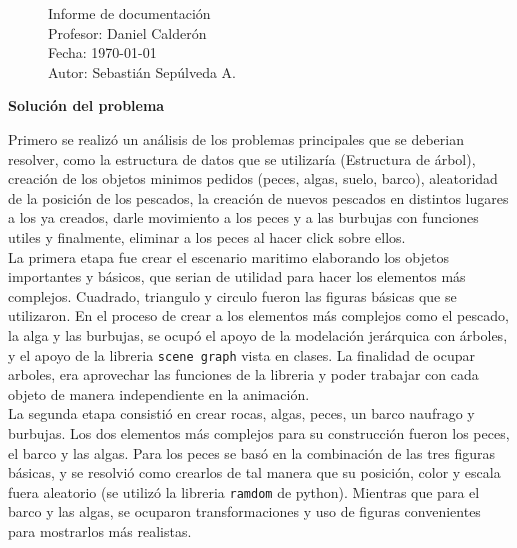 \documentclass[letterpaper,11pt]{article}
\begin{document}
\pagestyle{style2}
\begin{figure}
\centering
\begin{minipage}[c]{0.8\textwidth}
\centering
\vspace{0.3cm}
{\Large Informe de documentación}
\vspace{0.3cm}\\
Profesor: Daniel Calderón\\
Fecha: \today\\
Autor: Sebastián Sepúlveda A.
\end{minipage}
\end{figure}

\textbf{{\Large Solución del problema}}

Primero se realizó un análisis de los problemas principales que se deberian resolver, como la estructura de datos que se utilizaría (Estructura de árbol), creación de los objetos minimos pedidos (peces, algas, suelo, barco), aleatoridad de la posición de los pescados, la creación de nuevos pescados en distintos lugares a los ya creados, darle movimiento a los peces y a las burbujas con funciones utiles y finalmente, eliminar a los peces al hacer click sobre ellos.
\\

La primera etapa fue crear el escenario maritimo elaborando los objetos importantes y básicos, que serian de utilidad para hacer los elementos más complejos. Cuadrado, triangulo y circulo  fueron las figuras básicas que se utilizaron. En el proceso de crear a los elementos más complejos como el pescado, la alga y las burbujas, se ocupó el apoyo de la modelación jerárquica con árboles, y el apoyo de la libreria \texttt{scene graph} vista en clases. La finalidad de ocupar arboles, era aprovechar las funciones de la libreria y poder trabajar con cada objeto de manera independiente en la animación.
\\

La segunda etapa consistió en crear rocas, algas, peces, un barco naufrago y burbujas. Los dos elementos más complejos para su construcción fueron los peces, el barco y las algas. Para los peces se basó en la combinación de las tres figuras básicas, y se resolvió como crearlos de tal manera que su posición, color y escala fuera aleatorio (se utilizó la libreria \texttt{ramdom} de python). Mientras que para el barco y las algas, se ocuparon transformaciones y uso de figuras convenientes para mostrarlos más realistas.
\\
\end{document}
